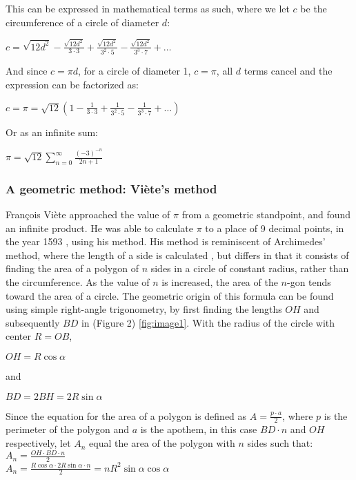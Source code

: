 This can be expressed in mathematical terms as such, where we let $c$ be the circumference of 
a circle of diameter $d$: 

$c = \sqrt{12 d^2} - \frac{\sqrt{12 d^2}}{3 \cdot 3} + \frac{\sqrt{12 d^2}}{3^2 \cdot 5} - \frac{\sqrt{12 d^2}}{3^3 \cdot 7} + \dots$

And since $c = \pi d$, for a circle of diameter 1, $c = \pi$, all $d$ terms cancel and 
the expression can be factorized as: 

$c = \pi = \sqrt{12} ( 1 - \frac{1}{3 \cdot 3} + \frac{1}{3^2 \cdot 5} - \frac{1}{3^3 \cdot 7} + \dots )$

Or as an infinite sum:

$\pi = \sqrt{12} \sum\limits_{n=0}^\infty \frac{(-3)^{-n}}{2n+1}$

\subsubsection{A geometric method: Viète's method}

François Viète approached the value of $\pi$ from a 
geometric standpoint, and found an infinite product. 
He was able to calculate $\pi$ to a place of 9 decimal points, in 
the year 1593 \cite{Kreminski}, using his method. His method is reminiscent 
of Archimedes' method, where the length of a side is calculated \cite{archimedespi}, 
but differs in that it consists of finding the area of a polygon of $n$ sides in a circle of constant 
radius, rather than the circumference. As the value of $n$ is increased, the area of the $n$-gon 
tends toward the area of a circle. The geometric origin of this formula 
can be found using simple right-angle trigonometry, by first finding 
the lengths $OH$ and subsequently $BD$ in (Figure 2) \ref{fig:image1}.
With the radius of the circle with center $R = OB$,

$OH = R \cos{\alpha}$ 

and

$BD = 2BH = 2 R \sin{\alpha}$

Since the equation for the area of a polygon is defined as $A = \frac{p \cdot a}{2}$, 
where $p$ is the perimeter of the polygon and $a$ is the apothem, in this case $BD \cdot n$ 
and $OH$ respectively, let $A_{n}$ equal the area of 
the polygon with $n$ sides such that: \\
$A_{n} = \frac{OH \cdot BD \cdot n}{2}$ \\
$A_{n} = \frac{R \cos{\alpha} \cdot 2 R \sin{\alpha} \cdot n}{2} = n R^2 \sin{\alpha} \cos{\alpha}$

